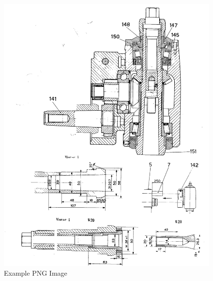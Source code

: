 \newpage
\begin{figure}[h]
    \centering
    \includegraphics[width=1.0\linewidth]{images/page_36}
    \caption{Example PNG Image}
    \label{fig:milling_head_2}
\end{figure}
